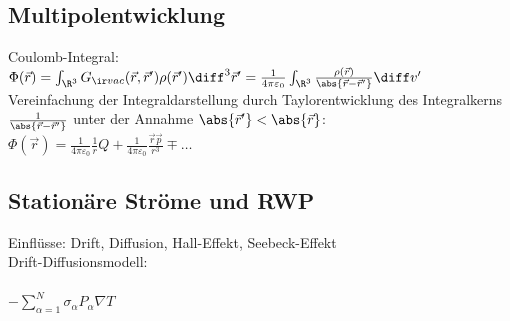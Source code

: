 \subsection*{Multipolentwicklung}
Coulomb-Integral: $\Phi(\vec r) = \int_{\R^3} G_{\ir vac}(\vec r, \vec r')\rho(\vec r') \diff^3 \vec r' = \frac{1}{4\pi\varepsilon_0}\int_{\R^3}  \frac{\rho(\vec r)}{\abs{\vec r - \vec r'}}\diff v'$\\
Vereinfachung der Integraldarstellung durch Taylorentwicklung des Integralkerns $\frac{1}{\abs{\vec r - \vec r'}}$ unter der Annahme $\abs{\vec r'} < \abs{\vec r}$:
$\Phi(\vec r) = \frac{1}{4\pi\varepsilon_0}\frac{1}{r}Q + \frac{1}{4\pi\varepsilon_0}\frac{\vec r  \vec p}{r^3} \mp \hdots$


\subsection{Stationäre Ströme und RWP}
Einflüsse: Drift, Diffusion, Hall-Effekt, Seebeck-Effekt\\
Drift-Diffusionsmodell:\\
\\
$-\sum\limits_{\alpha = 1}^N \sigma_\alpha P_\alpha \nabla T$

